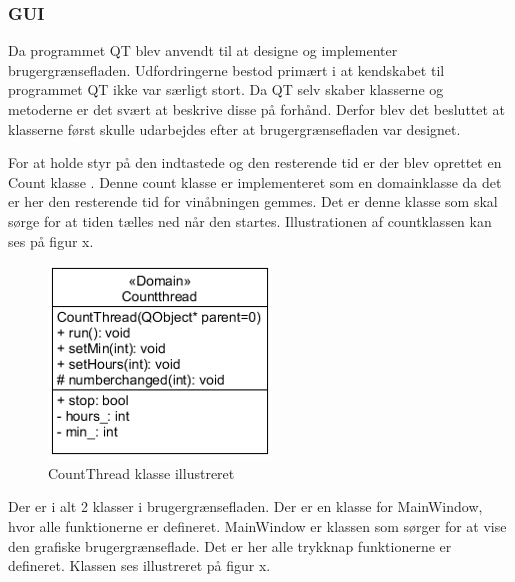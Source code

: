 \subsubsection{GUI}

Da programmet QT blev anvendt til at designe og implementer brugergrænsefladen. Udfordringerne bestod primært i at kendskabet til programmet QT ikke var særligt stort. Da QT selv skaber klasserne og metoderne er det svært at beskrive disse på forhånd. Derfor blev det besluttet at klasserne først skulle udarbejdes efter at brugergrænsefladen var designet. 

For at holde styr på den indtastede og den resterende tid er der blev oprettet en Count klasse . Denne count klasse er implementeret som en domainklasse da det er her den resterende tid for vinåbningen gemmes. Det er denne klasse som skal sørge for at tiden tælles ned når den startes. Illustrationen af countklassen kan ses på figur x.

\begin{figure}[H]
	\centerline{\includegraphics[scale=1]{tex/Design/GUI/Fotos/CountThread}}
	\caption{CountThread klasse illustreret}
\end{figure}

Der er i alt 2 klasser i brugergrænsefladen. Der er en klasse for MainWindow, hvor alle funktionerne er defineret. MainWindow er klassen som sørger for at vise den grafiske brugergrænseflade. Det er her alle trykknap funktionerne er defineret. Klassen ses illustreret på figur x. 

